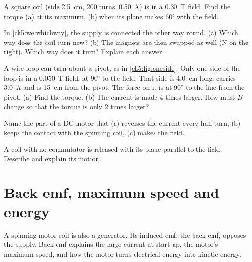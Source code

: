 \begin{quickcheck}
  \item A square coil (side \qty{2.5}{cm}, 200 turns, \qty{0.50}{A}) is in a
        \qty{0.30}{T} field. Find the torque (a) at its maximum, (b) when its plane
        makes \ang{60} with the field.
  \item In \cref{ch5:we:whichway}, the supply is connected the other way round.
        (a) Which way does the coil turn now? (b) The magnets are then swapped as well
        (N on the right). Which way does it turn? Explain each answer.
  \item A wire loop can turn about a pivot, as in \cref{ch5:fig:oneside}. Only one side
        of the loop is in a \qty{0.050}{T} field, at \ang{90} to the field. That side is
        \qty{4.0}{cm} long, carries \qty{3.0}{A} and is \qty{15}{cm} from the pivot. The
        force on it is at \ang{90} to the line from the pivot. (a) Find the torque.
        (b) The current is made 4 times larger. How must $B$ change so that the torque is
        only 2 times larger?
  \item Name the part of a DC motor that (a) reverses the current every half turn,
        (b) keeps the contact with the spinning coil, (c) makes the field.
  \item A coil with no commutator is released with its plane parallel to the field.
        Describe and explain its motion.
\end{quickcheck}

\section{Back emf, maximum speed and energy}\label{ch5:sec:backemf}

\begin{bigidea}
A spinning motor coil is also a generator. Its induced emf, the back emf, opposes the
supply. Back emf explains the large current at start-up, the motor's maximum speed,
and how the motor turns electrical energy into kinetic energy.
\end{bigidea}

\begin{keywords}
\end{keywords}

